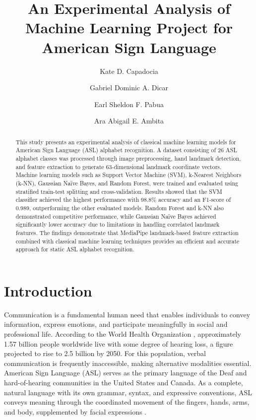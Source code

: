 \documentclass[12pt,runningheads]{llncs}
\begin{document}
\title{An Experimental Analysis of Machine Learning Project for American Sign Language}


\author{
Kate D. Capadocia \and
Gabriel Dominic A. Dicar \and
Earl Sheldon F. Pabua \and
Ara Abigail E. Ambita
}


\maketitle

\begin{abstract}
This study presents an experimental analysis of classical machine learning models for American Sign Language (ASL) alphabet recognition. A dataset consisting of 26 ASL alphabet classes was processed through image preprocessing, hand landmark detection, and feature extraction to generate 63-dimensional landmark coordinate vectors. Machine learning models such as Support Vector Machine (SVM), k-Nearest Neighbors (k-NN), Gaussian Na\"{i}ve Bayes, and Random Forest, were trained and evaluated using stratified train-test splitting and cross-validation. Results showed that the SVM classifier achieved the highest performance with 98.8\% accuracy and an F1-score of 0.989, outperforming the other evaluated models. Random Forest and k-NN also demonstrated competitive performance, while Gaussian Na\"{i}ve Bayes achieved significantly lower accuracy due to limitations in handling correlated landmark features. The findings demonstrate that MediaPipe landmark-based feature extraction combined with classical machine learning techniques provides an efficient and accurate approach for static ASL alphabet recognition.

\end{abstract}

\section{Introduction}

Communication is a fundamental human need that enables individuals to convey information, express emotions, and participate meaningfully in social and professional life. According to the World Health Organization \cite{who2021}, approximately 1.57 billion people worldwide live with some degree of hearing loss, a figure projected to rise to 2.5 billion by 2050. For this population, verbal communication is frequently inaccessible, making alternative modalities essential. American Sign Language (ASL) serves as the primary language of the Deaf and hard-of-hearing communities in the United States and Canada. As a complete, natural language with its own grammar, syntax, and expressive conventions, ASL conveys meaning through the coordinated movement of the fingers, hands, arms, and body, supplemented by facial expressions \cite{bakershenk1980}.
\end{document}
